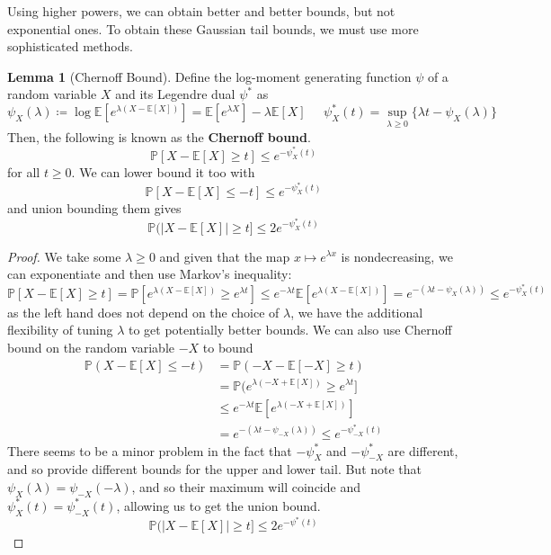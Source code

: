\documentclass{article}
\theoremstyle{definition}
\newtheorem{lemma}[theorem]{Lemma}
\theoremstyle{remark}
\theoremstyle{definition}
\begin{document}
Using higher powers, we can obtain better and better bounds, but not exponential ones. To obtain these Gaussian tail bounds, we must use more sophisticated methods. 

\begin{lemma}[Chernoff Bound]
Define the log-moment generating function $\psi$ of a random variable $X$ and its Legendre dual $\psi^*$ as 
\[\psi_X (\lambda) \coloneqq \log \mathbb{E}[ e^{\lambda (X - \mathbb{E}[X])} ] = \mathbb{E}[ e^{\lambda X} ] - \lambda \mathbb{E}[X] \;\;\;\;\; \psi_X^* (t) = \sup_{\lambda \geq 0} \{ \lambda t - \psi_X(\lambda)\}\]
Then, the following is known as the \textbf{Chernoff bound}. 
\[\mathbb{P}[X - \mathbb{E}[X] \geq t] \leq e^{-\psi_X^* (t)}\]
for all $t \geq 0$. We can lower bound it too with 
\[\mathbb{P}[X - \mathbb{E}[X] \leq -t] \leq e^{-\psi_X^* (t)}\]
and union bounding them gives 
\[\mathbb{P}(|X - \mathbb{E}[X] | \geq t ] \leq 2e^{- \psi_X^* (t)}\]
\end{lemma}
\begin{proof}
We take some $\lambda \geq 0$ and given that the map $x \mapsto e^{\lambda x}$ is nondecreasing, we can exponentiate and then use Markov's inequality: 
\[\mathbb{P}[X - \mathbb{E}[X] \geq t ] = \mathbb{P}[ e^{\lambda(X - \mathbb{E}[X])} \geq e^{\lambda t}] \leq e^{-\lambda t} \mathbb{E}[e^{\lambda (X - \mathbb{E}[X])}] = e^{- (\lambda t - \psi_X (\lambda))} \leq e^{-\psi_X^* (t)}\]
as the left hand does not depend on the choice of $\lambda$, we have the additional flexibility of tuning $\lambda$ to get potentially better bounds. We can also use Chernoff bound on the random variable $-X$ to bound \begin{align*}
    \mathbb{P}(X - \mathbb{E}[X] \leq -t) & = \mathbb{P}(-X - \mathbb{E}[-X] \geq t) \\
    & = \mathbb{P}(e^{\lambda(-X + \mathbb{E}[X])} \geq e^{\lambda t} ] \\
    & \leq e^{-\lambda t} \mathbb{E}[ e^{\lambda (-X + \mathbb{E}[X])}] \\
    & = e^{-(\lambda t - \psi_{-X}(\lambda))} \leq e^{-\psi_{-X}^* (t)} 
\end{align*}
There seems to be a minor problem in the fact that $-\psi^*_X$ and $-\psi^*_{-X}$ are different, and so provide different bounds for the upper and lower tail. But note that $\psi_X (\lambda) = \psi_{-X}(-\lambda)$, and so their maximum will coincide and $\psi_X^* (t) = \psi_{-X}^* (t)$, allowing us to get the union bound. 
\[\mathbb{P}(|X - \mathbb{E}[X] | \geq t ] \leq 2e^{- \psi^* (t)}\]
\end{proof}
\end{document}
